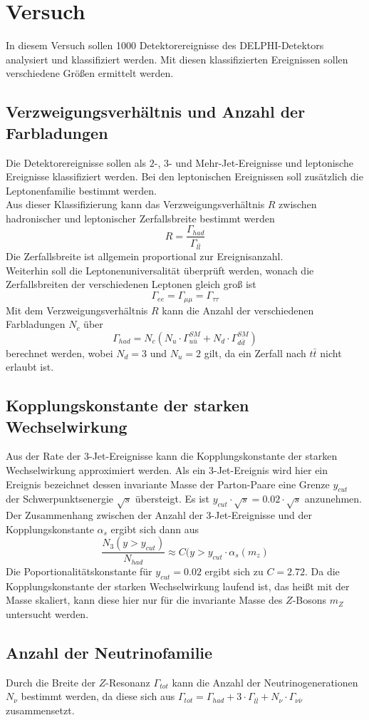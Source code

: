 \documentclass{include/thesisclass3}
\newcommand{\cc}{\cdot}
\begin{document}


\chapter{Versuch}
In diesem Versuch sollen 1000 Detektorereignisse des DELPHI-Detektors analysiert und klassifiziert werden. 
Mit diesen klassifizierten Ereignissen sollen verschiedene Größen ermittelt werden.

\section{Verzweigungsverhältnis und Anzahl der Farbladungen}
Die Detektorereignisse sollen als $2$-, $3$- und Mehr-Jet-Ereignisse und leptonische Ereignisse klassifiziert werden. Bei den leptonischen Ereignissen soll zusätzlich die Leptonenfamilie bestimmt werden.\\
Aus dieser Klassifizierung kann das Verzweigungsverhältnis $R$ zwischen hadronischer und leptonischer Zerfallsbreite bestimmt werden
\[ R = \frac{ \Gamma_{had}}{\Gamma_{l\bar l}}\]
Die Zerfallsbreite ist allgemein proportional zur Ereignisanzahl.\\
Weiterhin soll die Leptonenuniversalität überprüft werden, wonach die Zerfallsbreiten der verschiedenen Leptonen gleich groß ist
\[ \Gamma_{ee} = \Gamma_{\mu\mu} = \Gamma_{\tau\tau}\]
Mit dem Verzweigungsverhältnis $R$ kann die Anzahl der verschiedenen Farbladungen $N_c$ über
\[ \Gamma_{had} = N_c \left( N_u \cc \Gamma_{u\bar u}^{SM} + N_d \cc \Gamma_{d \bar d}^{SM}\right)\]
berechnet werden, wobei $N_d = 3$ und $N_u = 2$ gilt, da ein Zerfall nach $t \bar t$ nicht erlaubt ist. 

\section{Kopplungskonstante der starken Wechselwirkung}
Aus der Rate der $3$-Jet-Ereignisse kann die Kopplungskonstante der starken Wechselwirkung approximiert werden. Als ein $3$-Jet-Ereignis wird hier ein Ereignis bezeichnet dessen invariante Masse der Parton-Paare eine Grenze $y_{cut}$ der Schwerpunktsenergie $\sqrt{s}$ übersteigt. Es ist $y_{cut}\cc \sqrt{s} = 0.02 \cc \sqrt{s}$ anzunehmen. Der Zusammenhang zwischen der Anzahl der $3$-Jet-Ereignisse und der Kopplungskonstante $\alpha_s$ ergibt sich dann aus
\[ \frac{N_3(y > y_{cut})}{N_{had}} \approx C(y > y_{cut} \cc \alpha_s(m_z)\]
Die Poportionalitätskonstante für $y_{cut} = 0.02$ ergibt sich zu $C = 2.72$. Da die Kopplungskonstante der starken Wechselwirkung laufend ist, das heißt mit der Masse skaliert, kann diese hier nur für die invariante Masse des $Z$-Bosons $m_Z$ untersucht werden.

\section{Anzahl der Neutrinofamilie}
Durch die Breite der $Z$-Resonanz $\Gamma_{tot}$ kann die Anzahl der Neutrinogenerationen $N_\nu$ bestimmt werden, da diese sich aus $\Gamma_{tot} = \Gamma_{had} + 3 \cc \Gamma_{l \bar l} + N_\nu \cc \Gamma_{\nu \bar \nu}$ zusammensetzt.
\end{document}
